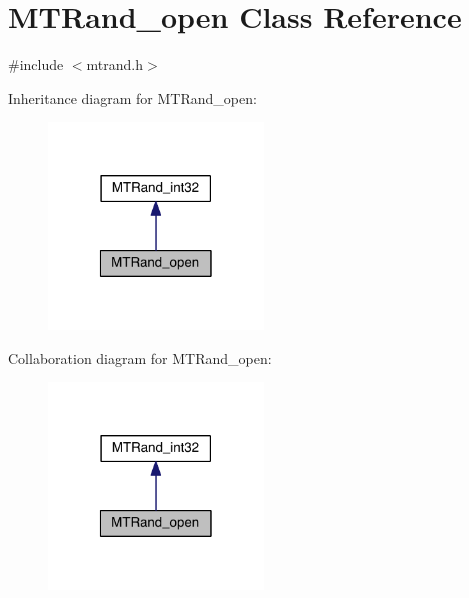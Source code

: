\hypertarget{a00020}{\section{M\-T\-Rand\-\_\-open Class Reference}
\label{a00020}
}


{\ttfamily \#include $<$mtrand.\-h$>$}



Inheritance diagram for M\-T\-Rand\-\_\-open\-:\nopagebreak
\begin{figure}[H]
\begin{center}
\leavevmode
\includegraphics[width=162pt]{a00162}
\end{center}
\end{figure}


Collaboration diagram for M\-T\-Rand\-\_\-open\-:\nopagebreak
\begin{figure}[H]
\begin{center}
\leavevmode
\includegraphics[width=162pt]{a00163}
\end{center}
\end{figure}
